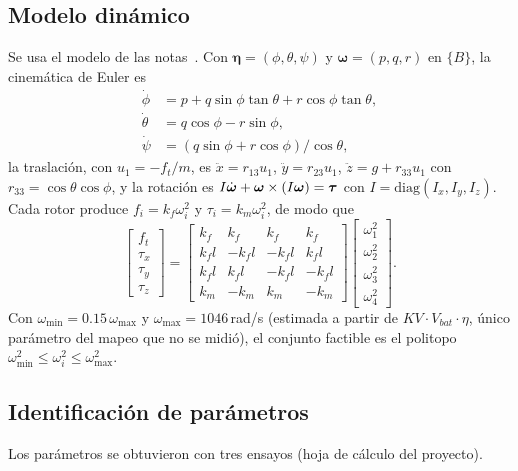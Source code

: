 \subsection{Modelo dinámico}
Se usa el modelo de las notas~\cite{notas1}. Con $\bm\eta=(\phi,\theta,\psi)$ y $\bm\omega=(p,q,r)$ en $\{B\}$, la cinemática de Euler es
\begin{align}
\dot\phi&=p+q\sin\phi\tan\theta+r\cos\phi\tan\theta,\nonumber\\
\dot\theta&=q\cos\phi-r\sin\phi,\label{eq:euler}\\
\dot\psi&=(q\sin\phi+r\cos\phi)/\cos\theta,\nonumber
\end{align}
la traslación, con $u_1=-f_t/m$, es $\ddot x=r_{13}u_1$, $\ddot y=r_{23}u_1$, $\ddot z=g+r_{33}u_1$ con $r_{33}=\cos\theta\cos\phi$, y la rotación es $I\dot{\bm\omega}+\bm\omega\times(I\bm\omega)=\bm{\tau}$ con $I=\mathrm{diag}(I_x,I_y,I_z)$. Cada rotor produce $f_i=k_f\omega_i^2$ y $\tau_i=k_m\omega_i^2$, de modo que
\begin{equation}
\begin{bmatrix}f_t\\ \tau_x\\ \tau_y\\ \tau_z\end{bmatrix}=
\begin{bmatrix}
k_f&k_f&k_f&k_f\\
k_fl&-k_fl&-k_fl&k_fl\\
k_fl&k_fl&-k_fl&-k_fl\\
k_m&-k_m&k_m&-k_m
\end{bmatrix}
\begin{bmatrix}\omega_1^2\\ \omega_2^2\\ \omega_3^2\\ \omega_4^2\end{bmatrix}.
\label{eq:mezcla}
\end{equation}
Con $\omega_{\min}=0.15\,\omega_{\max}$ y $\omega_{\max}=1046$\,rad/s (estimada a partir de $KV\cdot V_{bat}\cdot\eta$, único parámetro del mapeo que no se midió), el conjunto factible es el politopo $\omega_{\min}^2\le\omega_i^2\le\omega_{\max}^2$.

\subsection{Identificación de parámetros}
\label{sec:ident}
Los parámetros se obtuvieron con tres ensayos (hoja de cálculo del proyecto).

